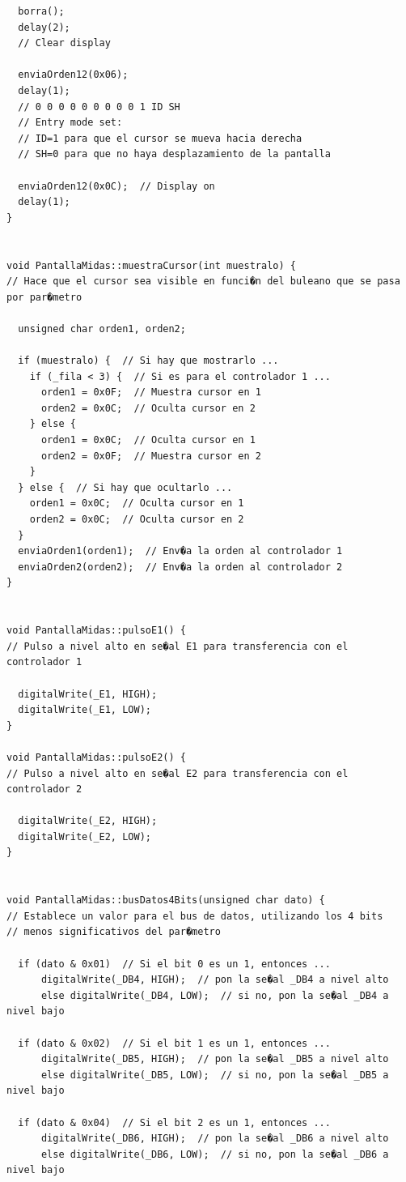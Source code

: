 \documentclass[11pt,twoside]{book}
\begin{document}
\begin{lstlisting}
  borra();
  delay(2);
  // Clear display
  
  enviaOrden12(0x06);
  delay(1);
  // 0 0 0 0 0 0 0 0 0 1 ID SH
  // Entry mode set: 
  // ID=1 para que el cursor se mueva hacia derecha
  // SH=0 para que no haya desplazamiento de la pantalla
  
  enviaOrden12(0x0C);  // Display on
  delay(1);
}


void PantallaMidas::muestraCursor(int muestralo) {
// Hace que el cursor sea visible en funci�n del buleano que se pasa por par�metro

  unsigned char orden1, orden2;
  
  if (muestralo) {  // Si hay que mostrarlo ...
    if (_fila < 3) {  // Si es para el controlador 1 ...
      orden1 = 0x0F;  // Muestra cursor en 1
      orden2 = 0x0C;  // Oculta cursor en 2
    } else {
      orden1 = 0x0C;  // Oculta cursor en 1
      orden2 = 0x0F;  // Muestra cursor en 2
    }
  } else {  // Si hay que ocultarlo ...
    orden1 = 0x0C;  // Oculta cursor en 1
    orden2 = 0x0C;  // Oculta cursor en 2
  }
  enviaOrden1(orden1);  // Env�a la orden al controlador 1
  enviaOrden2(orden2);  // Env�a la orden al controlador 2
}


void PantallaMidas::pulsoE1() {
// Pulso a nivel alto en se�al E1 para transferencia con el controlador 1

  digitalWrite(_E1, HIGH);
  digitalWrite(_E1, LOW);
}

void PantallaMidas::pulsoE2() {
// Pulso a nivel alto en se�al E2 para transferencia con el controlador 2

  digitalWrite(_E2, HIGH);
  digitalWrite(_E2, LOW);
}


void PantallaMidas::busDatos4Bits(unsigned char dato) {
// Establece un valor para el bus de datos, utilizando los 4 bits
// menos significativos del par�metro

  if (dato & 0x01)  // Si el bit 0 es un 1, entonces ...
      digitalWrite(_DB4, HIGH);  // pon la se�al _DB4 a nivel alto
      else digitalWrite(_DB4, LOW);  // si no, pon la se�al _DB4 a nivel bajo
      
  if (dato & 0x02)  // Si el bit 1 es un 1, entonces ...
      digitalWrite(_DB5, HIGH);  // pon la se�al _DB5 a nivel alto
      else digitalWrite(_DB5, LOW);  // si no, pon la se�al _DB5 a nivel bajo
      
  if (dato & 0x04)  // Si el bit 2 es un 1, entonces ...
      digitalWrite(_DB6, HIGH);  // pon la se�al _DB6 a nivel alto
      else digitalWrite(_DB6, LOW);  // si no, pon la se�al _DB6 a nivel bajo
      

\end{lstlisting}
\end{document}
